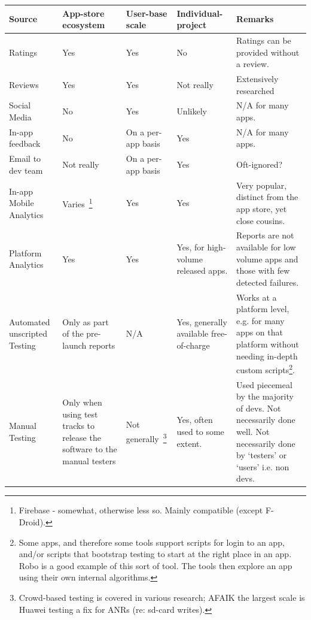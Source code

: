 \begin{table}[H]
	\setlength\tabcolsep{0.4em} %
	\def\arraystretch{1}%
	\scriptsize %
	\begin{tabular}{L{2cm} L{2.4cm} L{3.5cm} L{2.4cm} L{3.5cm}} %
		\toprule
		\textbf{Source} & \textbf{App-store ecosystem} & \textbf{User-base scale} & \textbf{Individual-project} & \textbf{Remarks} \\ \midrule
		Ratings & Yes & Yes & No & Ratings can be provided without a review. \\ \midrule
		Reviews & Yes & Yes & Not really & Extensively researched \\ \midrule
		Social Media & No & Yes & Unlikely & N/A for many apps. \\ \midrule
		In-app feedback & No & On a per-app basis & Yes & N/A for many apps. \\ \midrule
		Email to dev team & Not really & On a per-app basis & Yes & Oft-ignored? \\ \midrule
		In-app Mobile Analytics & Varies~\footnote{Firebase - somewhat, otherwise less so. Mainly compatible (except F-Droid).} & Yes & Yes & Very popular, distinct from the app store, yet close cousins. \\ \midrule
		Platform Analytics & Yes & Yes & Yes, for high-volume released apps. & Reports are not available for low volume apps and those with few detected failures.  \\ \midrule
		Automated unscripted Testing & Only as part of the pre-launch reports & N/A & Yes, generally available free-of-charge & Works at a platform level, e.g. for many apps on that platform without needing in-depth custom scripts\footnote{ Some apps, and therefore some tools support scripts for login to an app, and/or scripts that bootstrap testing to start at the right place in an app. Robo is a good example of this sort of tool. The tools then explore an app using their own internal algorithms.}. \\ \midrule
		Manual Testing & Only when using test tracks to release the software to the manual testers & Not generally~\footnote{Crowd-based testing is covered in various research; AFAIK the largest scale is Huawei testing a fix for ANRs (re: sd-card writes).} & Yes, often used to some extent. & Used piecemeal by the majority of devs. Not necessarily done well. Not necessarily done by ‘testers’ or ‘users’ i.e. non devs. \\ \midrule

\end{tabular}
\end{table}
